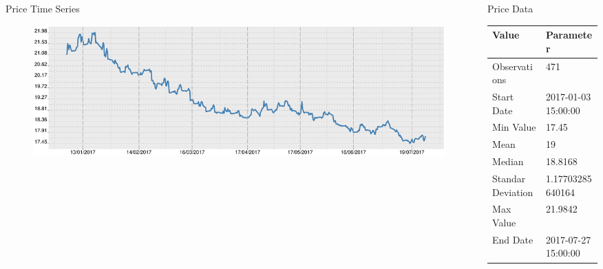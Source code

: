 \documentclass[final, xcolor=table]{beamer}\usepackage[]{graphicx}\usepackage[]{color}
\begin{document}

\begin{columns}[t]


\begin{column}{.66 \linewidth}

  \begin{block}{Price Time Series}

  \begin{figure}[H]
    \includegraphics[scale=1]{figure/Plot_ts-1.pdf}
  \end{figure}

  \end{block}
  
\end{column}


\begin{column}{.32 \linewidth}
  
  \begin{block}{Price Data}
  
  \centering
  
\begin{tabular}{l|l}
\hline
Value & Parameter\\
\hline
Observations & 471\\
\hline
Start Date & 2017-01-03 15:00:00\\
\hline
Min Value & 17.45\\
\hline
Mean & 19\\
\hline
Median & 18.8168\\
\hline
Standar Deviation & 1.17703285640164\\
\hline
Max Value & 21.9842\\
\hline
End Date & 2017-07-27 15:00:00\\
\hline
\end{tabular}



\end{block}
\end{column}
\end{columns}
\end{document}
